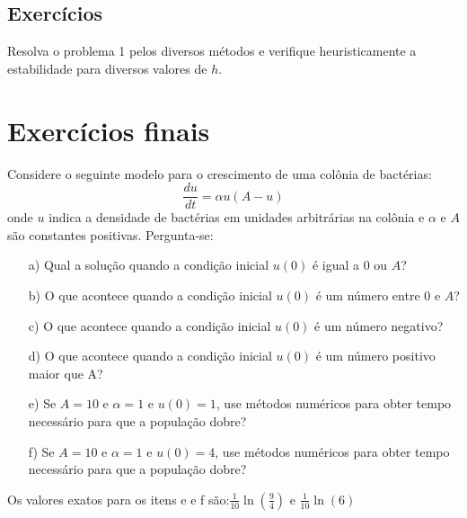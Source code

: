 








\subsection*{Exercícios}

\begin{exer} Resolva o problema 1 pelos diversos métodos e verifique heuristicamente a estabilidade para diversos valores de $h$.
\end{exer}












\section{Exercícios finais}

\begin{exer} Considere o seguinte modelo para o crescimento de uma colônia de bactérias:
\begin{equation} \frac{du}{dt}=\alpha u (A-u) \end{equation}
onde $u$ indica a densidade de bactérias em unidades arbitrárias na colônia e $\alpha$ e $A$ são constantes positivas.
Pergunta-se:
\begin{itemize}
\item[a)] Qual a solução quando a condição inicial $u(0)$ é igual a $0$ ou $A$?
\item[b)] O que acontece quando a condição inicial $u(0)$ é um número entre $0$ e $A$?
\item[c)] O que acontece quando a condição inicial $u(0)$ é um número negativo?
\item[d)] O que acontece quando a condição inicial $u(0)$ é um número positivo maior que A?
\item[e)] Se $A=10$ e $\alpha=1$ e $u(0)=1$, use métodos numéricos para obter tempo necessário para que a população dobre?
\item[f)] Se $A=10$ e $\alpha=1$ e $u(0)=4$, use métodos numéricos para obter tempo necessário para que a população dobre?
\end{itemize}
\end{exer}
\begin{resp}

Os valores exatos para os itens e e f são:$\frac{1}{10}\ln\left(\frac{9}{4}\right)$ e $\frac{1}{10}\ln\left(6\right)$

\end{resp}

